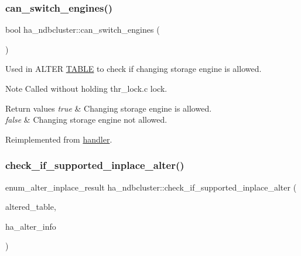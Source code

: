 \subsubsection{\texorpdfstring{can\+\_\+switch\+\_\+engines()}{can\_switch\_engines()}}
{\footnotesize\ttfamily bool ha\+\_\+ndbcluster\+::can\+\_\+switch\+\_\+engines (\begin{DoxyParamCaption}{ }\end{DoxyParamCaption})\hspace{0.3cm}{\ttfamily [virtual]}}

Used in A\+L\+T\+ER \mbox{\hyperlink{structTABLE}{T\+A\+B\+LE}} to check if changing storage engine is allowed.

\begin{DoxyNote}{Note}
Called without holding thr\+\_\+lock.\+c lock.
\end{DoxyNote}

\begin{DoxyRetVals}{Return values}
{\em true} & Changing storage engine is allowed. \\
\hline
{\em false} & Changing storage engine not allowed. \\
\hline
\end{DoxyRetVals}


Reimplemented from \mbox{\hyperlink{classhandler_a6baab93a22543b707e6e59b9d59810d2}{handler}}.

\mbox{\label{classha__ndbcluster_a178fe8e973508932db3d3d6ca3a625a9}} 
\subsubsection{\texorpdfstring{check\+\_\+if\+\_\+supported\+\_\+inplace\+\_\+alter()}{check\_if\_supported\_inplace\_alter()}}
{\footnotesize\ttfamily enum\+\_\+alter\+\_\+inplace\+\_\+result ha\+\_\+ndbcluster\+::check\+\_\+if\+\_\+supported\+\_\+inplace\+\_\+alter (\begin{DoxyParamCaption}\item[{\mbox{\hyperlink{structTABLE}{T\+A\+B\+LE}} $\ast$}]{altered\+\_\+table,  }\item[{\mbox{\hyperlink{classAlter__inplace__info}{Alter\+\_\+inplace\+\_\+info}} $\ast$}]{ha\+\_\+alter\+\_\+info }\end{DoxyParamCaption})\hspace{0.3cm}{\ttfamily [virtual]}}

